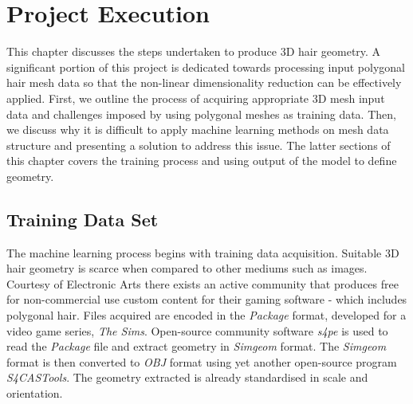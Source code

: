 \documentclass[ %
author={Dillon Keith Diep},
supervisor={Dr. Carl Henrik Ek},
degree={MEng},
title={ART-CG:},
subtitle={Assisted Real-time Content Generation of 3D Hair by Learning Manifolds},
type={Research},
year={2017} ]{dissertation}
\begin{document}

\chapter{Project Execution}
\label{chap:execution}

This chapter discusses the steps undertaken to produce 3D hair geometry. A significant portion of this project is dedicated towards processing input polygonal hair mesh data so that the non-linear dimensionality reduction can be effectively applied. First, we outline the process of acquiring appropriate 3D mesh input data and challenges imposed by using polygonal meshes as training data. Then, we discuss why it is difficult to apply machine learning methods on mesh data structure and presenting a solution to address this issue. The latter sections of this chapter covers the training process and using output of the model to define geometry.

\section{Training Data Set}
The machine learning process begins with training data acquisition. Suitable 3D hair geometry is scarce when compared to other mediums such as images. Courtesy of Electronic Arts there exists an active community that produces free for non-commercial use custom content for their gaming software - which includes polygonal hair\cite{tsr}. Files acquired are encoded in the \textit{Package} format, developed for a video game series, \textit{The Sims}. Open-source community software \textit{s4pe} is used to read the \textit{Package} file and extract geometry in \textit{Simgeom} format\cite{s4pe}. The \textit{Simgeom} format is then converted to \textit{OBJ} format using yet another open-source program \textit{S4CASTools}\cite{s4cas}. The geometry extracted is already standardised in scale and orientation.
\end{document}
